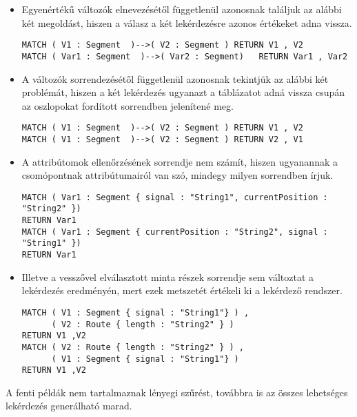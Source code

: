 \begin{itemize}
	\item Egyenértékű változók elnevezésétől függetlenül azonosnak találjuk az alábbi két megoldást, hiszen a válasz a két lekérdezésre azonos értékeket adna vissza.
\begin{lstlisting}[style=cyphersmall]
MATCH ( V1 : Segment  )-->( V2 : Segment ) RETURN V1 , V2
MATCH ( Var1 : Segment  )-->( Var2 : Segment)	RETURN Var1 , Var2
\end{lstlisting}
	\item A változók sorrendezésétől függetlenül azonosnak tekintjük az alábbi két problémát, hiszen a két lekérdezés ugyanazt a táblázatot adná vissza csupán az oszlopokat fordított sorrendben jelenítené meg.
\begin{lstlisting}[style=cyphersmall]
MATCH ( V1 : Segment  )-->( V2 : Segment ) RETURN V1 , V2
MATCH ( V1 : Segment  )-->( V2 : Segment ) RETURN V2 , V1
\end{lstlisting}
	\item A attribútomok ellenőrzésének sorrendje nem számít, hiszen ugyanannak a csomópontnak attribútumairól van szó, mindegy milyen sorrendben írjuk.
\begin{lstlisting}[style=cyphersmall]
MATCH ( Var1 : Segment { signal : "String1", currentPosition : "String2" }) 
RETURN Var1
MATCH ( Var1 : Segment { currentPosition : "String2", signal : "String1" })
RETURN Var1
\end{lstlisting}
	\item Illetve a vesszővel elválasztott minta részek sorrendje sem változtat a lekérdezés eredményén, mert ezek metszetét értékeli ki a lekérdező rendszer.  
\begin{lstlisting}[style=cyphersmall]
MATCH ( V1 : Segment { signal : "String1"} ) , 
	  ( V2 : Route { length : "String2" } )
RETURN V1 ,V2
MATCH ( V2 : Route { length : "String2" } ) ,
	  ( V1 : Segment { signal : "String1"} )  
RETURN V1 ,V2
\end{lstlisting}
\end{itemize}

A fenti példák nem tartalmaznak lényegi szűrést, továbbra is az összes lehetséges lekérdezés generálható marad.

